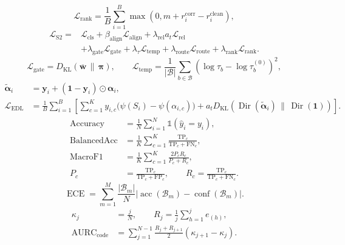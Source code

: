 \documentclass{article}
\begin{document}
\begin{equation}
\mathcal{L}_{\mathrm{rank}}
=
\frac{1}{B}\sum_{i=1}^{B}
\max\!\left(
0,
m+r_i^{\mathrm{corr}}-r_i^{\mathrm{clean}}
\right),
\tag{20}
\end{equation}
\begin{equation}
\begin{aligned}
\mathcal{L}_{\mathrm{S2}}
={}&
\mathcal{L}_{\mathrm{cls}}
+\beta_{\mathrm{align}}\mathcal{L}_{\mathrm{align}}
+\lambda_{\mathrm{rel}}a_t\mathcal{L}_{\mathrm{rel}} \\
&+\lambda_{\mathrm{gate}}\mathcal{L}_{\mathrm{gate}}
+\lambda_{\tau}\mathcal{L}_{\mathrm{temp}}
+\lambda_{\mathrm{route}}\mathcal{L}_{\mathrm{route}}
+\lambda_{\mathrm{rank}}\mathcal{L}_{\mathrm{rank}}.
\end{aligned}
\tag{21}
\end{equation}
\begin{equation}
\mathcal{L}_{\mathrm{gate}}
=
D_{\mathrm{KL}}\!\left(
\overline{\mathbf{w}}\,\|\,\boldsymbol{\pi}
\right),
\qquad
\mathcal{L}_{\mathrm{temp}}
=
\frac{1}{|\mathcal{B}|}
\sum_{b\in\mathcal{B}}
\left(
\log\tau_b-\log\tau_b^{(0)}
\right)^2,
\tag{22}
\end{equation}
\begin{equation}
\begin{aligned}
\widetilde{\boldsymbol{\alpha}}_i
&=
\mathbf{y}_i
+(\mathbf{1}-\mathbf{y}_i)\odot\boldsymbol{\alpha}_i, \\
\mathcal{L}_{\mathrm{EDL}}
&=
\frac{1}{B}\sum_{i=1}^{B}
\left[
\sum_{c=1}^{K}y_{i,c}
\bigl(\psi(S_i)-\psi(\alpha_{i,c})\bigr)
+a_tD_{\mathrm{KL}}\!\left(
\operatorname{Dir}(\widetilde{\boldsymbol{\alpha}}_i)
\,\|\,
\operatorname{Dir}(\mathbf{1})
\right)
\right].
\end{aligned}
\tag{23}
\end{equation}
\begin{equation}
\begin{aligned}
\operatorname{Accuracy}
&=
\frac{1}{N}\sum_{i=1}^{N}
\mathbb{1}(\widehat{y}_i=y_i), \\
\operatorname{BalancedAcc}
&=
\frac{1}{K}\sum_{c=1}^{K}
\frac{\mathrm{TP}_c}{\mathrm{TP}_c+\mathrm{FN}_c}, \\
\operatorname{MacroF1}
&=
\frac{1}{K}\sum_{c=1}^{K}
\frac{2P_cR_c}{P_c+R_c}, \\
P_c
&=
\frac{\mathrm{TP}_c}{\mathrm{TP}_c+\mathrm{FP}_c},
\qquad
R_c
=
\frac{\mathrm{TP}_c}{\mathrm{TP}_c+\mathrm{FN}_c}.
\end{aligned}
\tag{24}
\end{equation}
\begin{equation}
\operatorname{ECE}
=
\sum_{m=1}^{M}
\frac{|\mathcal{B}_m|}{N}
\left|
\operatorname{acc}(\mathcal{B}_m)
-
\operatorname{conf}(\mathcal{B}_m)
\right|.
\tag{25}
\end{equation}
\begin{equation}
\begin{aligned}
\kappa_j
&=\frac{j}{N},
\qquad
R_j=\frac{1}{j}\sum_{h=1}^{j}e_{(h)}, \\
\operatorname{AURC}_{\mathrm{code}}
&=
\sum_{j=1}^{N-1}
\frac{R_j+R_{j+1}}{2}
\left(\kappa_{j+1}-\kappa_j\right).
\end{aligned}
\tag{26}
\end{equation}
\end{document}
